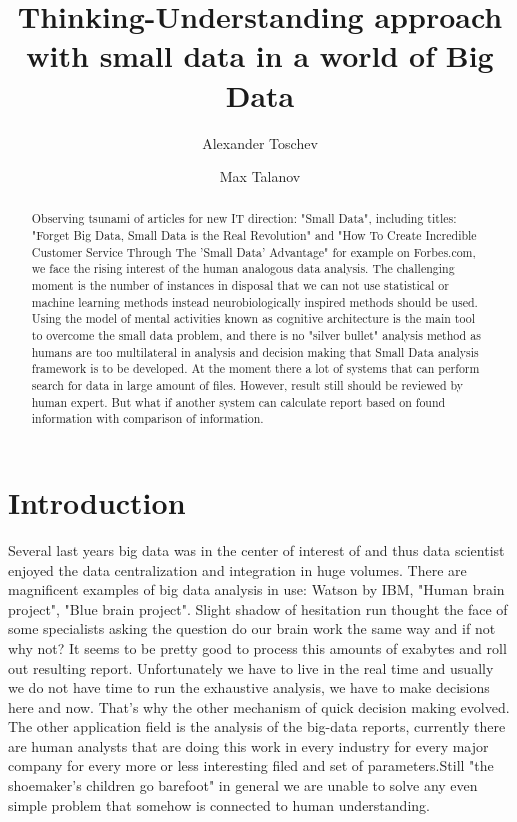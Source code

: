 \documentclass[procedia]{easychair}
\title{Thinking-Understanding approach with small data in a world of Big Data}
\author{
Alexander Toschev\inst{1}
\and
Max Talanov \inst{1}
}
\institute{
Kazan Federal University, Russia.
}
\begin{document}
\maketitle

\begin{abstract}
Observing tsunami of articles for new IT direction: "Small Data", including titles: "Forget Big Data, Small Data is the Real Revolution" and "How To Create Incredible Customer Service Through The 'Small Data' Advantage" for example on Forbes.com, we face the rising interest of the human analogous data analysis. The challenging moment is the number of instances in disposal that we can not use statistical or machine learning methods instead neurobiologically inspired methods should be used. Using the model of mental activities known as cognitive architecture is the main tool to overcome the small data problem, and there is no "silver bullet" analysis method as humans are too multilateral in analysis and decision making that Small Data analysis framework is to be developed.
At the moment there a lot of systems that can perform search for data in large amount of files. However, result still should be reviewed by human expert. But what if another system can calculate report based on found information with comparison of information.


\end{abstract}

\section{Introduction}

Several last years big data was in the center of interest of and thus data scientist enjoyed the data centralization and integration in huge volumes. There are magnificent examples of big data analysis in use: Watson by IBM, "Human brain project", "Blue brain project". Slight shadow of hesitation run thought the face of some specialists asking the question do our brain work the same way and if not why not? It seems to be pretty good to process this amounts of exabytes and roll out resulting report. Unfortunately we have to live in the real time and usually we do not have time to run the exhaustive analysis, we have to make decisions here and now. That's why the other mechanism of quick decision making evolved. The other application field is the analysis of the big-data reports, currently there are human analysts that are doing this work in every industry for every major company for every more or less interesting filed and set of parameters.Still "the shoemaker's children go barefoot" in general we are unable to solve any even simple problem that somehow is connected to human understanding.
\end{document}
